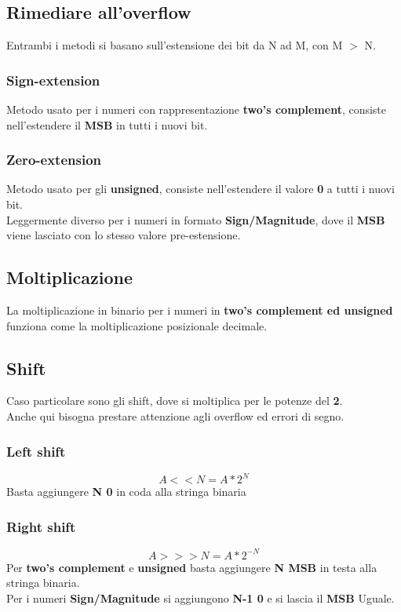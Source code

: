 \documentclass{report}
\begin{document}
    \subsection{Rimediare all'overflow}
        Entrambi i metodi si basano sull'estensione dei bit da N ad M, con M $>$ N.
        \subsubsection{Sign-extension}
            Metodo usato per i numeri con rappresentazione \textbf{two's complement},
            consiste nell'estendere il \textbf{MSB} in tutti i nuovi bit.
        \subsubsection{Zero-extension}
            Metodo usato per gli \textbf{unsigned}, consiste nell'estendere il 
            valore \textbf{0} a tutti i nuovi bit. \\
            Leggermente diverso per i numeri in formato \textbf{Sign/Magnitude}, 
            dove il \textbf{MSB} viene lasciato con lo stesso valore pre-estensione.
    \newpage
    \subsection{Moltiplicazione}
        La moltiplicazione in binario per i numeri in \textbf{two's complement ed unsigned}
        funziona come la moltiplicazione posizionale decimale.
    \subsection{Shift}
        Caso particolare sono gli shift, dove si moltiplica per le potenze del \textbf{2}. \\
        Anche qui bisogna prestare attenzione agli overflow ed errori di segno.
        \subsubsection{Left shift}
            $$A << N = A * 2^N$$
            Basta aggiungere \textbf{N 0} in coda alla stringa binaria
        \subsubsection{Right shift}
            $$A >>> N = A * 2^{-N}$$
            Per \textbf{two's complement} e \textbf{unsigned} basta aggiungere
            \textbf{N MSB} in testa alla stringa binaria. \\
            Per i numeri \textbf{Sign/Magnitude} si aggiungono \textbf{N-1 0} e
            si lascia il \textbf{MSB} Uguale.
    \newpage
\end{document}

